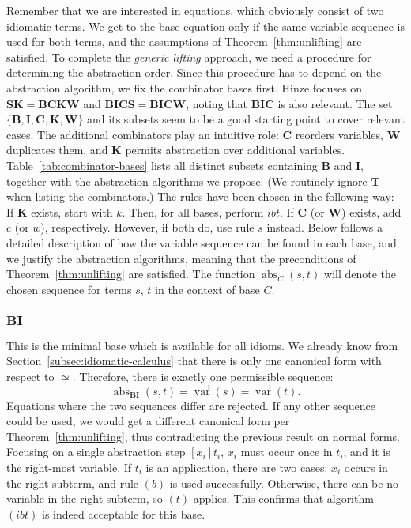 Remember that we are interested in equations, which obviously consist of two
idiomatic terms.
We get to the base equation only if the same variable sequence is used for both
terms, and the assumptions of Theorem~\ref{thm:unlifting} are satisfied.
To complete the \emph{generic lifting} approach, we need a procedure for
determining the abstraction order.
Since this procedure has to depend on the abstraction algorithm, we fix the
combinator bases first.
Hinze focuses on $\mathbf{SK = BCKW}$ and $\mathbf{BICS = BICW}$, noting
that $\mathbf{BIC}$ is also relevant.
The set $\{\mathbf{B,I,C,K,W}\}$ and its subsets seem to be a good starting
point to cover relevant cases.
The additional combinators play an intuitive role:
$\mathbf{C}$ reorders variables, $\mathbf{W}$ duplicates them, and $\mathbf{K}$
permits abstraction over additional variables.
Table~\ref{tab:combinator-bases} lists all distinct subsets containing
$\mathbf{B}$ and $\mathbf{I}$, together with the abstraction algorithms we
propose.
(We routinely ignore $\mathbf{T}$ when listing the combinators.)
The rules have been chosen in the following way:
If $\mathbf{K}$ exists, start with $k$.
Then, for all bases, perform $ibt$.
If $\mathbf{C}$ (or $\mathbf{W}$) exists, add $c$ (or $w$), respectively.
However, if both do, use rule $s$ instead.
Below follows a detailed description of how the variable sequence can be found
in each base, and we justify the abstraction algorithms, meaning that the
preconditions of Theorem~\ref{thm:unlifting} are satisfied.
The function $\operatorname{abs}_C(s,t)$ will denote the chosen sequence for
terms $s$, $t$ in the context of base $C$.

\subsubsection*{$\mathbf{BI}$}\label{subsec:base-bi}

This is the minimal base which is available for all idioms.
We already know from Section~\ref{subsec:idiomatic-calculus} that there is only
one canonical form with respect to $\simeq$.
Therefore, there is exactly one permissible sequence:
\[ \operatorname{abs}_\mathbf{BI}(s,t) = \overrightarrow{\operatorname{var}}(s)
	= \overrightarrow{\operatorname{var}}(t). \]
Equations where the two sequences differ are rejected.
If any other sequence could be used, we would get a different canonical form
per Theorem~\ref{thm:unlifting}, thus contradicting the previous result on
normal forms.
Focusing on a single abstraction step $[x_i]t_i$, $x_i$ must occur once in
$t_i$, and it is the right-most variable.
If $t_i$ is an application, there are two cases:
$x_i$ occurs in the right subterm, and rule $(b)$ is used successfully.
Otherwise, there can be no variable in the right subterm, so $(t)$ applies.
This confirms that algorithm $(ibt)$ is indeed acceptable for this base.

